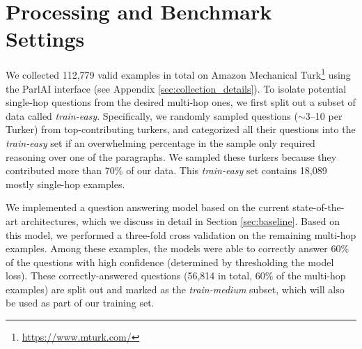 \section{Processing and Benchmark Settings}

We collected 112,779 valid examples in total on Amazon Mechanical Turk\footnote{\url{https://www.mturk.com/}} using the ParlAI interface \cite{miller2017parlai} (see Appendix \ref{sec:collection_details}).%
To isolate potential single-hop questions from the desired multi-hop ones, we first split out a subset of data called \textit{train-easy}.
Specifically, we randomly sampled questions ($\sim$3--10 per Turker) from top-contributing turkers, and categorized all their questions into the \textit{train-easy} set if an overwhelming percentage in the sample only required reasoning over one of the paragraphs.
We sampled these turkers because they contributed more than 70\% of our data.
This \textit{train-easy} set contains 18,089 mostly single-hop examples.%

We implemented a question answering model based on the current state-of-the-art architectures, which we discuss in detail in Section \ref{sec:baseline}.
Based on this model, we performed a three-fold cross validation on the remaining multi-hop examples.
Among these examples, the models were able to correctly answer 60\% of the questions with high confidence (determined by thresholding the model loss).
These correctly-answered questions (56,814 in total, 60\% of the multi-hop examples) are split out and marked as the \textit{train-medium} subset, which will also be used as part of our training set.

